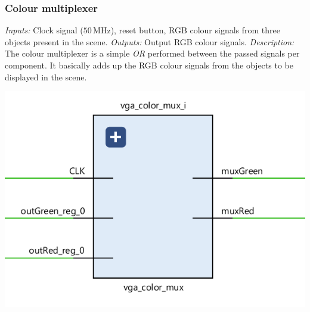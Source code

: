 \documentclass[11pt,a4paper]{article}
\def\MHz{\,\mathrm{MHz}}
\begin{document}
        \subsubsection*{Colour multiplexer}
        \begin{minipage}{.45\textwidth}
            \emph{Inputs:} Clock signal ($50\MHz$), reset button, RGB colour signals from three objects present in the scene.
            \emph{Outputs:} Output RGB colour signals.
            \emph{Description:} The colour multiplexer is a simple \emph{OR} performed between the passed signals per component. It basically adds up the RGB colour signals from the objects to be displayed in the scene.
        \end{minipage}
        \hfill
        \begin{minipage}{.45\textwidth}
            \includegraphics[width=\textwidth]{src/color-mux.png}
        \end{minipage}
\end{document}
